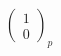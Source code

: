 \documentclass[preview]{standalone}
\begin{document}
\begin{align*}
\begin{pmatrix}1\\ 0\end{pmatrix}_p
\end{align*}
\end{document}
